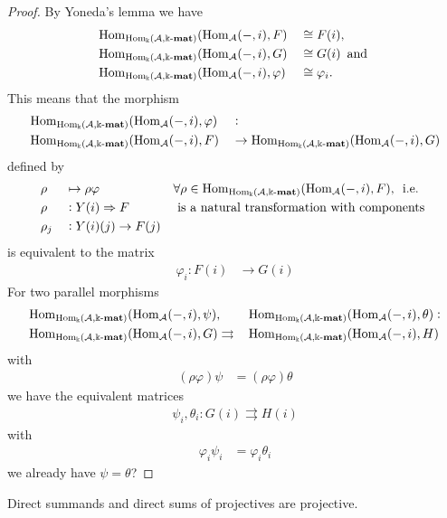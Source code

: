 \begin{proof}
By Yoneda's lemma we have 
\begin{alignat}{2}
&\mathrm{Hom}_{\mathrm{Hom_{\Bbbk}}(\mathcal{A},\Bbbk\textnormal{-}\mathbf{mat})}(\mathrm{Hom}_{\mathcal{A}}(-,i),F) &&\cong F(i), \\
&\mathrm{Hom}_{\mathrm{Hom_{\Bbbk}}(\mathcal{A},\Bbbk\textnormal{-}\mathbf{mat})}(\mathrm{Hom}_{\mathcal{A}}(-,i),G) &&\cong G(i)\, \text{ and } \\
&\mathrm{Hom}_{\mathrm{Hom_{\Bbbk}}(\mathcal{A},\Bbbk\textnormal{-}\mathbf{mat})}(\mathrm{Hom}_{\mathcal{A}}(-,i),\varphi) &&\cong \varphi_{i}.
\end{alignat}
This means that the morphism
\begin{alignat*}{2}
&\mathrm{Hom}_{\mathrm{Hom_{\Bbbk}}(\mathcal{A},\Bbbk\textnormal{-}\mathbf{mat})}(\mathrm{Hom}_{\mathcal{A}}(-,i),\varphi) &&:\\
&\mathrm{Hom}_{\mathrm{Hom_{\Bbbk}}(\mathcal{A},\Bbbk\textnormal{-}\mathbf{mat})}(\mathrm{Hom}_{\mathcal{A}}(-,i),F)
	&&\rightarrow \mathrm{Hom}_{\mathrm{Hom_{\Bbbk}}(\mathcal{A},\Bbbk\textnormal{-}\mathbf{mat})}(\mathrm{Hom}_{\mathcal{A}}(-,i),G)
\end{alignat*}
defined by
\begin{alignat*}{3}
&\rho &&\mapsto \rho\varphi &&\forall \rho \in \mathrm{Hom}_{\mathrm{Hom_{\Bbbk}}(\mathcal{A},\Bbbk\textnormal{-}\mathbf{mat})}(\mathrm{Hom}_{\mathcal{A}}(-,i),F),\,\text{ i.e. }\\
&\rho &&: Y(i) \Rightarrow F\, &&\text{ is a natural transformation with components }\\
&\rho_{j} &&: Y(i)(j) \rightarrow F(j)&&
\end{alignat*}
is equivalent to the matrix
\begin{align}
\varphi_{i} : F(i) &\rightarrow G(i)
\end{align}
For two parallel morphisms 
\begin{alignat}{2}
&\mathrm{Hom}_{\mathrm{Hom_{\Bbbk}}(\mathcal{A},\Bbbk\textnormal{-}\mathbf{mat})}(\mathrm{Hom}_{\mathcal{A}}(-,i),\psi),
&&\,\mathrm{Hom}_{\mathrm{Hom_{\Bbbk}}(\mathcal{A},\Bbbk\textnormal{-}\mathbf{mat})}(\mathrm{Hom}_{\mathcal{A}}(-,i),\theta) : \\
&\mathrm{Hom}_{\mathrm{Hom_{\Bbbk}}(\mathcal{A},\Bbbk\textnormal{-}\mathbf{mat})}(\mathrm{Hom}_{\mathcal{A}}(-,i),G)
\rightrightarrows &&\,\mathrm{Hom}_{\mathrm{Hom_{\Bbbk}}(\mathcal{A},\Bbbk\textnormal{-}\mathbf{mat})}(\mathrm{Hom}_{\mathcal{A}}(-,i),H)
\end{alignat}
with
\begin{align}
(\rho\varphi)\psi &= (\rho\varphi)\theta
\end{align}
we have the equivalent matrices
\begin{align}
\psi_{i}, \theta_{i} : G(i) \rightrightarrows H(i)
\end{align}
with
\begin{align}
\varphi_{i}\psi_{i} &= \varphi_{i}\theta_{i}
\end{align}
we already have $\psi = \theta$?
\end{proof}

Direct summands and direct sums of projectives are projective.

